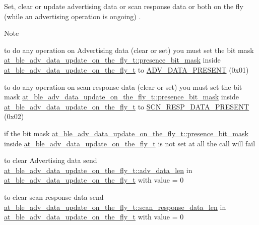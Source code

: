 Set, clear or update advertising data or scan response data or both on the fly (while an advertising operation is ongoing) . 

\begin{DoxyNote}{Note}

\begin{DoxyItemize}
\item to do any operation on Advertising data (clear or set) you must set the bit mask \mbox{\hyperlink{structat__ble__adv__data__update__on__the__fly__t_a51f5db07c335999b716439f52693153e}{at\+\_\+ble\+\_\+adv\+\_\+data\+\_\+update\+\_\+on\+\_\+the\+\_\+fly\+\_\+t\+::presence\+\_\+bit\+\_\+mask}} inside \mbox{\hyperlink{structat__ble__adv__data__update__on__the__fly__t}{at\+\_\+ble\+\_\+adv\+\_\+data\+\_\+update\+\_\+on\+\_\+the\+\_\+fly\+\_\+t}} to \mbox{\hyperlink{at__ble__api_8h_ad35ea6c7ddf7f4ba30514bd6c2c11232}{A\+D\+V\+\_\+\+D\+A\+T\+A\+\_\+\+P\+R\+E\+S\+E\+NT}} (0x01)
\item to do any operation on scan response data (clear or set) you must set the bit mask \mbox{\hyperlink{structat__ble__adv__data__update__on__the__fly__t_a51f5db07c335999b716439f52693153e}{at\+\_\+ble\+\_\+adv\+\_\+data\+\_\+update\+\_\+on\+\_\+the\+\_\+fly\+\_\+t\+::presence\+\_\+bit\+\_\+mask}} inside \mbox{\hyperlink{structat__ble__adv__data__update__on__the__fly__t}{at\+\_\+ble\+\_\+adv\+\_\+data\+\_\+update\+\_\+on\+\_\+the\+\_\+fly\+\_\+t}} to \mbox{\hyperlink{at__ble__api_8h_a2e78b0afe66c462d12ce94807f14785a}{S\+C\+N\+\_\+\+R\+E\+S\+P\+\_\+\+D\+A\+T\+A\+\_\+\+P\+R\+E\+S\+E\+NT}} (0x02)
\item if the bit mask \mbox{\hyperlink{structat__ble__adv__data__update__on__the__fly__t_a51f5db07c335999b716439f52693153e}{at\+\_\+ble\+\_\+adv\+\_\+data\+\_\+update\+\_\+on\+\_\+the\+\_\+fly\+\_\+t\+::presence\+\_\+bit\+\_\+mask}} inside \mbox{\hyperlink{structat__ble__adv__data__update__on__the__fly__t}{at\+\_\+ble\+\_\+adv\+\_\+data\+\_\+update\+\_\+on\+\_\+the\+\_\+fly\+\_\+t}} is not set at all the call will fail
\item to clear Advertising data send \mbox{\hyperlink{structat__ble__adv__data__update__on__the__fly__t_a75fd7fdf06a003b4e9b217d58cd6b077}{at\+\_\+ble\+\_\+adv\+\_\+data\+\_\+update\+\_\+on\+\_\+the\+\_\+fly\+\_\+t\+::adv\+\_\+data\+\_\+len}} in \mbox{\hyperlink{structat__ble__adv__data__update__on__the__fly__t}{at\+\_\+ble\+\_\+adv\+\_\+data\+\_\+update\+\_\+on\+\_\+the\+\_\+fly\+\_\+t}} with value = 0
\item to clear scan response data send \mbox{\hyperlink{structat__ble__adv__data__update__on__the__fly__t_aa364778628ff80935bf4515826aae316}{at\+\_\+ble\+\_\+adv\+\_\+data\+\_\+update\+\_\+on\+\_\+the\+\_\+fly\+\_\+t\+::scan\+\_\+response\+\_\+data\+\_\+len}} in \mbox{\hyperlink{structat__ble__adv__data__update__on__the__fly__t}{at\+\_\+ble\+\_\+adv\+\_\+data\+\_\+update\+\_\+on\+\_\+the\+\_\+fly\+\_\+t}} with value = 0

\end{DoxyItemize}
\end{DoxyNote}
